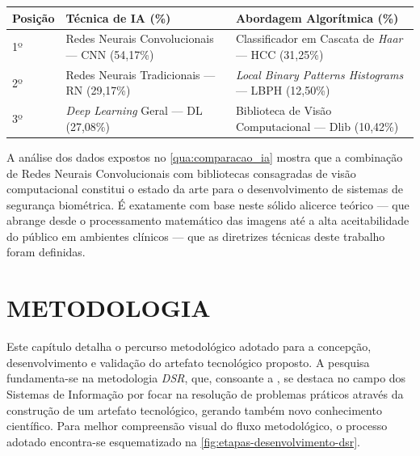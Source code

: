 \begin{quadro}[htbp]
    \centering
    \caption{Comparação de Técnicas de IA e Algoritmos na Literatura}
    \label{qua:comparacao_ia}
    \small
    \begin{tabularx}{\textwidth}{|>{\centering\arraybackslash}p{1.4cm}|>{\raggedright\arraybackslash}X|>{\raggedright\arraybackslash}X|}
        \hline
        \textbf{Posição} & \textbf{Técnica de IA (\%)} & \textbf{Abordagem Algorítmica (\%)} \\
        \hline
        1º & Redes Neurais Convolucionais — CNN (54,17\%) & Classificador em Cascata de \textit{Haar} — HCC (31,25\%) \\
        \hline
        2º & Redes Neurais Tradicionais — RN (29,17\%) & \textit{Local Binary Patterns Histograms} — LBPH (12,50\%) \\
        \hline
        3º & \textit{Deep Learning} Geral — DL (27,08\%) & Biblioteca de Visão Computacional — Dlib (10,42\%) \\
        \hline
    \end{tabularx}
\end{quadro}

A análise dos dados expostos no \autoref{qua:comparacao_ia} mostra que a combinação de Redes Neurais Convolucionais com bibliotecas consagradas de visão computacional constitui o estado da arte para o desenvolvimento de sistemas de segurança biométrica. É exatamente com base neste sólido alicerce teórico — que abrange desde o processamento matemático das imagens até a alta aceitabilidade do público em ambientes clínicos — que as diretrizes técnicas deste trabalho foram definidas.

\section{METODOLOGIA}
\label{sec:metodologia}

 Este capítulo detalha o percurso metodológico adotado para a concepção, desenvolvimento e validação do artefato tecnológico proposto. A pesquisa fundamenta-se na metodologia \textit{DSR}, que, consoante a , se destaca no campo dos Sistemas de Informação por focar na resolução de problemas práticos através da construção de um artefato tecnológico, gerando também novo conhecimento científico. Para melhor compreensão visual do fluxo metodológico, o processo adotado encontra-se esquematizado na \autoref{fig:etapas-desenvolvimento-dsr}.

